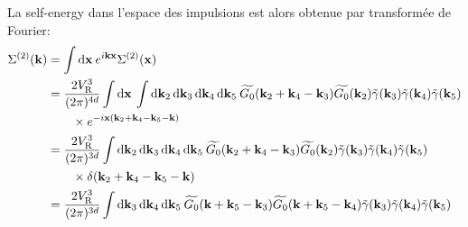 La self-energy dans l'espace des impulsions est alors obtenue par transformée de Fourier: 
\begin{align}
\Sigma^{(2)}(\mathbf{k})&=\int{\mathop{}\mathopen{}\mathrm{d}\mathbf{x} \: e^{i \mathbf{k}\mathbf{x}} \Sigma^{(2)}(\mathbf{x})} \\
&= \frac{2V_{\mathrm{R}}^3}{(2\pi)^{4d}} \int{\mathop{}\mathopen{}\mathrm{d}\mathbf{x} \: \int{\mathop{}\mathopen{}\mathrm{d}\mathbf{k}_{\mathrm{2}}\mathop{}\mathopen{}\mathrm{d}\mathbf{k}_{\mathrm{3}}\mathop{}\mathopen{}\mathrm{d}\mathbf{k}_{\mathrm{4}}\mathop{}\mathopen{}\mathrm{d}\mathbf{k}_{\mathrm{5}}\: \widetilde{G_0}(\mathbf{k}_{\mathrm{2}}+\mathbf{k}_{\mathrm{4}}-\mathbf{k}_{\mathrm{3}}) \widetilde{G_0}(\mathbf{k}_{\mathrm{2}})\tilde{\gamma}(\mathbf{k}_{\mathrm{3}})\tilde{\gamma}(\mathbf{k}_{\mathrm{4}})\tilde{\gamma}(\mathbf{k}_{\mathrm{5}})}} \\
&\nonumber \qquad \times e^{-i \mathbf{x} (\mathbf{k}_{\mathrm{2}} + \mathbf{k}_{\mathrm{4}} - \mathbf{k}_{\mathrm{5}} - \mathbf{k})} \\
&= \frac{2V_{\mathrm{R}}^3}{(2\pi)^{3d}} \int{\mathop{}\mathopen{}\mathrm{d}\mathbf{k}_{\mathrm{2}}\mathop{}\mathopen{}\mathrm{d}\mathbf{k}_{\mathrm{3}}\mathop{}\mathopen{}\mathrm{d}\mathbf{k}_{\mathrm{4}}\mathop{}\mathopen{}\mathrm{d}\mathbf{k}_{\mathrm{5}}\: \widetilde{G_0}(\mathbf{k}_{\mathrm{2}}+\mathbf{k}_{\mathrm{4}}-\mathbf{k}_{\mathrm{3}}) \widetilde{G_0}(\mathbf{k}_{\mathrm{2}})\tilde{\gamma}(\mathbf{k}_{\mathrm{3}})\tilde{\gamma}(\mathbf{k}_{\mathrm{4}})\tilde{\gamma}(\mathbf{k}_{\mathrm{5}})}\\
&\nonumber \qquad \times\delta(\mathbf{k}_{\mathrm{2}} + \mathbf{k}_{\mathrm{4}} - \mathbf{k}_{\mathrm{5}} - \mathbf{k}) \\
&= \frac{2V_{\mathrm{R}}^3}{(2\pi)^{3d}} \int{\mathop{}\mathopen{}\mathrm{d}\mathbf{k}_{\mathrm{3}} \mathop{}\mathopen{}\mathrm{d}\mathbf{k}_{\mathrm{4}}\mathop{}\mathopen{}\mathrm{d}\mathbf{k}_{\mathrm{5}} \: \widetilde{G_0}(\mathbf{k}+\mathbf{k}_{\mathrm{5}}-\mathbf{k}_{\mathrm{3}}) \widetilde{G_0}(\mathbf{k}+\mathbf{k}_{\mathrm{5}}-\mathbf{k}_{\mathrm{4}})\tilde{\gamma}(\mathbf{k}_{\mathrm{3}})\tilde{\gamma}(\mathbf{k}_{\mathrm{4}})\tilde{\gamma}(\mathbf{k}_{\mathrm{5}})} 
\end{align}

